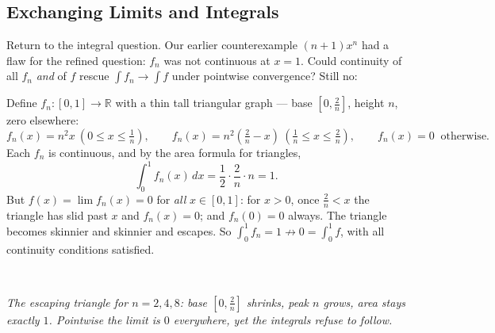 \documentclass[11pt]{report}
\newcommand{\figcap}[1]{\\[1.5mm]\parbox{0.92\textwidth}{\small\itshape #1}}
\begin{document}
\subsection{Exchanging Limits and Integrals}

Return to the integral question. Our earlier counterexample $(n+1)x^n$ had a flaw for the refined question: $f_n$ was not continuous at $x = 1$. Could continuity of all $f_n$ \emph{and} of $f$ rescue $\int f_n \to \int f$ under pointwise convergence? Still no:

\begin{exbox}
Define $f_n: [0,1] \to \mathbb{R}$ with a thin tall triangular graph --- base $[0, \tfrac2n]$, height $n$, zero elsewhere:
\[
f_n(x) = n^2 x \ \left(0 \leq x \leq \tfrac1n\right), \qquad
f_n(x) = n^2\left(\tfrac2n - x\right) \ \left(\tfrac1n \leq x \leq \tfrac2n\right), \qquad
f_n(x) = 0 \ \text{ otherwise}.
\]
Each $f_n$ is continuous, and by the area formula for triangles,
\[
\int_0^1 f_n(x)\,dx = \frac12 \cdot \frac2n \cdot n = 1.
\]
But $f(x) = \lim f_n(x) = 0$ for \emph{all} $x \in [0,1]$: for $x > 0$, once $\tfrac2n < x$ the triangle has slid past $x$ and $f_n(x) = 0$; and $f_n(0) = 0$ always. The triangle becomes skinnier and skinnier and escapes. So $\int_0^1 f_n = 1 \not\to 0 = \int_0^1 f$, with all continuity conditions satisfied.
\end{exbox}

\begin{center}
\figcap{The escaping triangle for $n = 2, 4, 8$: base $[0, \tfrac2n]$ shrinks, peak $n$ grows, area stays exactly $1$. Pointwise the limit is $0$ everywhere, yet the integrals refuse to follow.}
\end{center}
\end{document}
